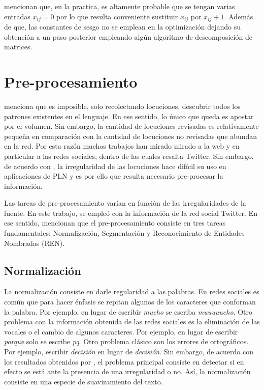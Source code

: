 \cite{shi2014linking} mencionan que, en la practica, es altamente probable que se tengan varias entradas $x_{ij}=0$ por lo que resulta conveniente sustituir $x_{ij}$ por $x_{ij} +1$. Además de que, las constantes de sesgo no se emplean en la optimización dejando su obtención a un paso posterior empleando algún algoritmo de descomposición de matrices.

\section{Pre-procesamiento}
\label{sec:sec23}

\cite{chomsky2004estructuras} menciona que es imposible, solo recolectando locuciones, descubrir todos los patrones existentes en el lenguaje. En ese sentido, lo único que queda es apostar por el volumen. Sin embargo, la cantidad de locuciones revisadas es relativamente pequeña en comparación con la cantidad de locuciones no revisadas que abundan en la red. Por esta razón muchos trabajos han mirado mirado a la web y en particular a las redes sociales, dentro de las cuales resalta Twitter. Sin embargo, de acuerdo con \cite{clark2011text}, la irregularidad de las locuciones hace difícil su uso en aplicaciones de PLN y es por ello que resulta necesario pre-procesar la información.

Las tareas de pre-procesamiento varían en función de las irregularidades de la fuente. En este trabajo, se empleó con la información de la red social Twitter. En ese sentido, \cite{billal2016efficient} mencionan que el pre-procesamiento consiste en tres tareas fundamentales: Normalización, Segmentación y Reconocimiento de Entidades Nombradas (REN).

\subsection{Normalización}
La normalización consiste en darle regularidad a las palabras. En redes sociales es común que para hacer énfasis se repitan algunos de los caracteres que conforman la palabra. Por ejemplo, en lugar de escribir \textit{mucho} se escriba \textit{muuuuucho}. Otro problema con la información obtenida de las redes sociales es la eliminación de las vocales o el cambio de algunos caracteres. Por ejemplo, en lugar de escribir \textit{porque} solo se escribe \textit{pq}. Otro problema clásico son los errores de ortográficos. Por ejemplo, escribir \textit{decisión} en lugar de \textit{decisión}. Sin embargo, de acuerdo con los resultados obtenidos por \cite{hassan2013social}, el problema principal consiste en detectar si en efecto se está ante la presencia de una irregularidad o no. Así, la normalización consiste en una especie de suavizamiento del texto. 

